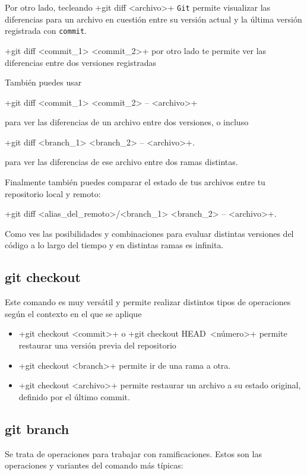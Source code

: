 \documentclass[a4paper,10pt]{article}
\begin{document}
    Por otro lado, tecleando \cverb+git diff <archivo>+ \verb+Git+ permite visualizar las diferencias para un archivo en cuestión entre su versión actual y la última versión registrada con \verb+commit+.
    
    \cverb+git diff <commit_1> <commit_2>+ por otro lado te permite ver las diferencias entre dos versiones registradas
    
    También puedes usar 
    
    \cverb+git diff <commit_1> <commit_2> -- <archivo>+ 
    
    para ver las diferencias de un archivo entre dos versiones, o incluso 
    
    \cverb+git diff <branch_1> <branch_2> -- <archivo>+.
    
    para ver las diferencias de ese archivo entre dos ramas distintas.
    
    Finalmente también puedes comparar el estado de tus archivos entre tu repositorio local y remoto:
    
    \cverb+git diff <alias_del_remoto>/<branch_1> <branch_2> -- <archivo>+.
    
    Como ves las posibilidades y combinaciones para evaluar distintas versiones del código a lo largo del tiempo y en distintas ramas es infinita.
    
    \subsection{git checkout}
      Este comando es muy versátil y permite realizar distintos tipos de operaciones según el contexto en el que se aplique
      \begin{itemize}
       \item \cverb+git checkout <commit>+ o \cverb+git checkout HEAD~<número>+ permite restaurar una versión previa del repositorio
       \item \cverb+git checkout <branch>+ permite ir de una rama a otra.
       \item \cverb+git checkout <archivo>+ permite restaurar un archivo a su estado original, definido por el último commit.
      \end{itemize}
      
    \subsection{git branch}
      Se trata de operaciones para trabajar con ramificaciones. Estos son las operaciones y variantes del comando más típicas:
      
\end{document}
